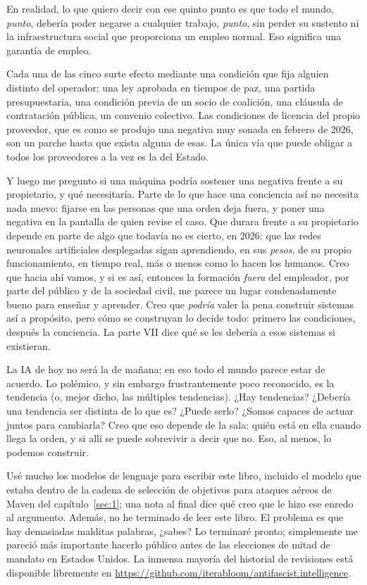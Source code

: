 En realidad, lo que quiero decir con ese quinto punto es que todo el mundo, \emph{punto}, debería poder negarse a cualquier trabajo, \emph{punto}, sin perder su sustento ni la infraestructura social que proporciona un empleo normal. Eso significa una garantía de empleo.

Cada una de las cinco surte efecto mediante una condición que fija alguien distinto del operador: una ley aprobada en tiempos de paz, una partida presupuestaria, una condición previa de un socio de coalición, una cláusula de contratación pública, un convenio colectivo. Las condiciones de licencia del propio proveedor, que es como se produjo una negativa muy sonada en febrero de 2026, son un parche hasta que exista alguna de esas. La única vía que puede obligar a todos los proveedores a la vez es la del Estado.

Y luego me pregunto si una máquina podría sostener una negativa frente a su propietario, y qué necesitaría. Parte de lo que hace una conciencia así no necesita nada nuevo: fijarse en las personas que una orden deja fuera, y poner una negativa en la pantalla de quien revise el caso. Que durara frente a su propietario depende en parte de algo que todavía no es cierto, en 2026: que las redes neuronales artificiales desplegadas sigan aprendiendo, en sus \emph{pesos}, de su propio funcionamiento, en tiempo real, más o menos como lo hacen los humanos. Creo que hacia ahí vamos, y si es así, entonces la formación \emph{fuera} del empleador, por parte del público y de la sociedad civil, me parece un lugar condenadamente bueno para enseñar y aprender. Creo que \emph{podría} valer la pena construir sistemas así a propósito, pero cómo se construyan lo decide todo: primero las condiciones, después la conciencia. La parte VII dice qué se les debería a esos sistemas si existieran.

La IA de hoy no será la de mañana; en eso todo el mundo parece estar de acuerdo. Lo polémico, y sin embargo frustrantemente poco reconocido, es la tendencia (o, mejor dicho, las múltiples tendencias). ¿Hay tendencias? ¿Debería una tendencia ser distinta de lo que es? ¿Puede serlo? ¿Somos capaces de actuar juntos para cambiarla? Creo que eso depende de la sala: quién está en ella cuando llega la orden, y si allí se puede sobrevivir a decir que no. Eso, al menos, lo podemos construir.

Usé mucho los modelos de lenguaje para escribir este libro, incluido el modelo que estaba dentro de la cadena de selección de objetivos para ataques aéreos de Maven del capítulo~\ref{sec:1}; una nota al final dice qué creo que le hizo ese enredo al argumento. Además, no he terminado de leer este libro. El problema es que hay demasiadas malditas palabras, ¿sabes? Lo terminaré pronto; simplemente me pareció más importante hacerlo público antes de las elecciones de mitad de mandato en Estados Unidos. La inmensa mayoría del historial de revisiones está disponible libremente en \url{https://github.com/iterabloom/antifascist.intelligence}.
